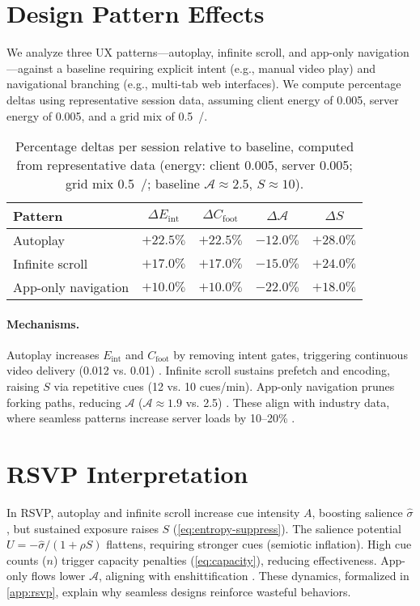 \documentclass[openany]{book}
\newcommand{\Sent}{S} %
\newcommand{\Eint}{E_{\mathrm{int}}} %
\newcommand{\Cfoot}{C_{\mathrm{foot}}} %
\newcommand{\Auton}{\mathcal{A}} %
\newcommand{\kWh}{\mathrm{kWh}}
\begin{document}
\section{Design Pattern Effects}
\label{sec:pattern-effects}
We analyze three UX patterns---autoplay, infinite scroll, and app-only navigation---against a baseline requiring explicit intent (e.g., manual video play) and navigational branching (e.g., multi-tab web interfaces). We compute percentage deltas using representative session data, assuming client energy of \SI{0.005}{\kWh}, server energy of \SI{0.005}{\kWh}, and a grid mix of \SI{0.5}{\kgCOe/\kWh}.

\begin{table}[h]
\centering
\begin{tabular}{lcccc}
\hline
\textbf{Pattern} & $\Delta \Eint$ & $\Delta \Cfoot$ & $\Delta \Auton$ & $\Delta \Sent$ \\
\hline
Autoplay & $+22.5\%$ & $+22.5\%$ & $-12.0\%$ & $+28.0\%$ \\
Infinite scroll & $+17.0\%$ & $+17.0\%$ & $-15.0\%$ & $+24.0\%$ \\
App-only navigation & $+10.0\%$ & $+10.0\%$ & $-22.0\%$ & $+18.0\%$ \\
\hline
\end{tabular}
\caption{Percentage deltas per session relative to baseline, computed from representative data (energy: client \SI{0.005}{\kWh}, server \SI{0.005}{\kWh}; grid mix \SI{0.5}{\kgCOe/\kWh}; baseline $\Auton \approx 2.5$, $\Sent \approx 10$).}
\label{tab:deltas}
\end{table}

\paragraph{Mechanisms.}
Autoplay increases \(\Eint\) and \(\Cfoot\) by removing intent gates, triggering continuous video delivery (\SI{0.012}{\kWh} vs. \SI{0.01}{\kWh}) \citep{extentia2024}. Infinite scroll sustains prefetch and encoding, raising \(\Sent\) via repetitive cues (12 vs. 10 cues/min). App-only navigation prunes forking paths, reducing \(\Auton\) (\(\Auton \approx 1.9\) vs. 2.5) \citep{doctorow2022}. These align with industry data, where seamless patterns increase server loads by 10--20\% \citep{colak2024}.

\section{RSVP Interpretation}
\label{sec:hidden-rsvp}
In RSVP, autoplay and infinite scroll increase cue intensity \(A\), boosting salience \(\widehat{\sigma}\), but sustained exposure raises \(\Sent\) (\cref{eq:entropy-suppress}). The salience potential \(U = -\widehat{\sigma}/(1+\rho \Sent)\) flattens, requiring stronger cues (semiotic inflation). High cue counts (\(n\)) trigger capacity penalties (\cref{eq:capacity}), reducing effectiveness. App-only flows lower \(\Auton\), aligning with enshittification \citep{doctorow2022}. These dynamics, formalized in \cref{app:rsvp}, explain why seamless designs reinforce wasteful behaviors.
\end{document}
